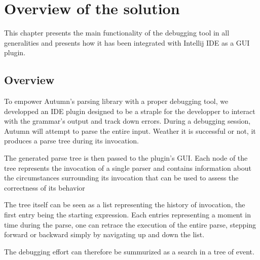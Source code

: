 %
\chapter{Overview of the solution}
%
This chapter presents the main functionality of the debugging tool in all generalities and presents how it has been integrated with Intellij IDE as a GUI plugin.

\section{Overview}
To empower Autumn's parsing library with a proper debugging tool, we developped an IDE plugin designed to be a straple for the developper to interact with the grammar's output and track down errors. During a debugging session, Autumn will attempt to parse the entire input. Weather it is successful or not, it produces a parse tree during its invocation.

\bigskip

The generated parse tree is then passed to the plugin's GUI. Each node of the tree represents the invocation of a single parser and contains information about the circumstances surrounding its invocation that can be used to assess the correctness of its behavior

\bigskip

The tree itself can be seen as a list representing the history of invocation, the first entry being the starting expression. Each entries representing a moment in time during the parse, one can retrace the execution of the entire parse, stepping forward or backward simply by navigating up and down the list. 

\bigskip

The debugging effort can therefore be summurized as a search in a tree of event.


